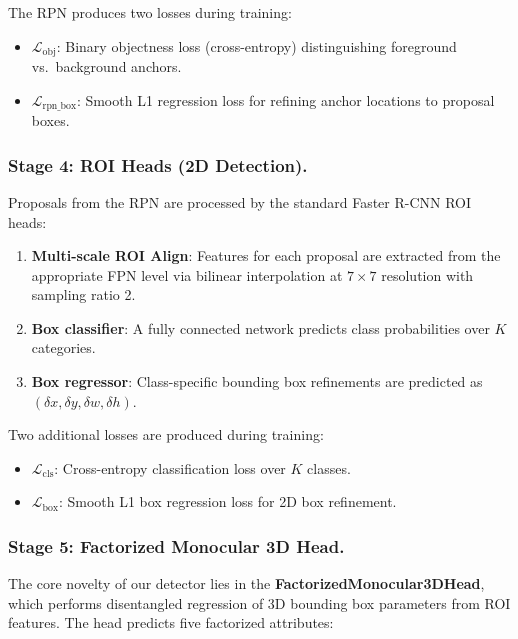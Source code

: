 \documentclass[runningheads]{llncs}
\begin{document}
The RPN produces two losses during training:
\begin{itemize}
    \item $\mathcal{L}_{\text{obj}}$: Binary objectness loss (cross-entropy) distinguishing foreground vs.\ background anchors.
    \item $\mathcal{L}_{\text{rpn\_box}}$: Smooth L1 regression loss for refining anchor locations to proposal boxes.
\end{itemize}

\subsubsection{Stage 4: ROI Heads (2D Detection).}
\label{sec:roi_heads}
Proposals from the RPN are processed by the standard Faster R-CNN ROI heads:

\begin{enumerate}
    \item \textbf{Multi-scale ROI Align}: Features for each proposal are extracted from the appropriate FPN level via bilinear interpolation at $7 \times 7$ resolution with sampling ratio 2.
    \item \textbf{Box classifier}: A fully connected network predicts class probabilities over $K$ categories.
    \item \textbf{Box regressor}: Class-specific bounding box refinements are predicted as $(\delta x, \delta y, \delta w, \delta h)$.
\end{enumerate}

Two additional losses are produced during training:
\begin{itemize}
    \item $\mathcal{L}_{\text{cls}}$: Cross-entropy classification loss over $K$ classes.
    \item $\mathcal{L}_{\text{box}}$: Smooth L1 box regression loss for 2D box refinement.
\end{itemize}

\subsubsection{Stage 5: Factorized Monocular 3D Head.}
\label{sec:3d_head}
The core novelty of our detector lies in the \textbf{FactorizedMonocular3DHead}, which performs disentangled regression of 3D bounding box parameters from ROI features.
The head predicts five factorized attributes:
\end{document}
